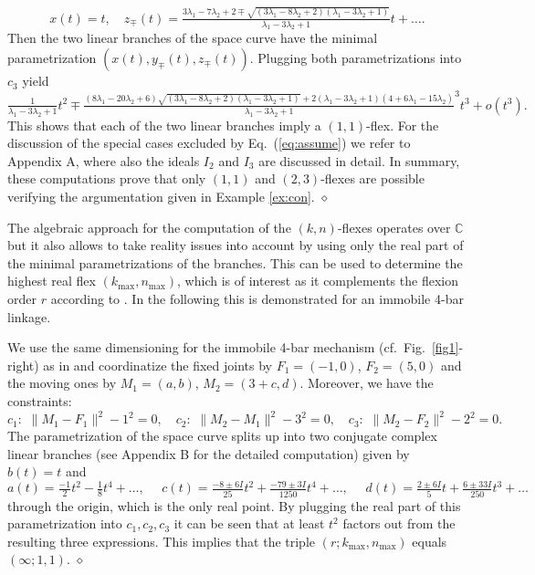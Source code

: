 \documentclass{svproc}
\def\CC{{\mathbb C}}
\begin{document}
\begin{example}
\begin{equation}
x(t)=t, \quad z_{\mp}(t)= \tfrac{3\lambda_1 - 7\lambda_2 + 2 \mp \sqrt{(3\lambda_1 - 8\lambda_2 + 2)(\lambda_1 - 3\lambda_2 + 1)} }{\lambda_1 - 3\lambda_2 + 1}t
+\ldots .
\end{equation} 
Then the two linear branches of the space curve have the minimal parametrization $(x(t),y_\mp(t),z_\mp(t))$. Plugging both  parametrizations into $c_3$ yield
\begin{equation*}
 \tfrac{1}{\lambda_1 - 3\lambda_2 + 1}t^2 \mp 
\tfrac{(8\lambda_1 - 20\lambda_2 + 6)\sqrt{(3\lambda_1 - 8\lambda_2 + 2)(\lambda_1 - 3\lambda_2 + 1)} + 2(\lambda_1 - 3\lambda_2 + 1)(4 + 6\lambda_1 - 15\lambda_2)}{\lambda_1 - 3\lambda_2 + 1}^3 t^3 +o(t^3).
\end{equation*}
This shows that each of the two linear branches imply a $(1,1)$-flex. 
For the discussion of the special cases excluded by  Eq.\ (\ref{eq:assume}) we refer to Appendix A, where also the ideals $I_2$ and $I_3$ are discussed in detail. In summary, these computations prove that only $(1,1)$ and $(2,3)$-flexes are possible verifying the argumentation given in Example \ref{ex:con}.
\hfill $\diamond$
\end{example}


The algebraic approach for the computation of the $(k,n)$-flexes  operates over $\CC$ but it also allows to take reality issues into account by using only the real part of the minimal parametrizations of the branches. This can be used to determine the highest real flex $(k_{\max},n_{\max})$, which is of interest as it  complements the flexion order $r$ according to  \cite[item 3 of Sec.\ 5]{MMT}. In the following this is demonstrated for an immobile 4-bar linkage.


\begin{example}\label{ex4}
We use the same dimensioning for the immobile 4-bar mechanism (cf.\ Fig.\ \ref{fig1}-right) as in \cite[Sec.\ 3.2]{nayak} and coordinatize the fixed joints by $F_1=(-1,0)$, $F_2=(5,0)$ and the moving ones by $M_1=(a,b)$, $M_2=(3+c,d)$. 
Moreover, we have the constraints:
\begin{equation*}
c_1:\,\,\|M_1-F_1\|^2-1^2=0,\quad
c_2:\,\,\|M_2-M_1\|^2-3^2=0,\quad
c_3:\,\,\|M_2-F_2\|^2-2^2=0.
\end{equation*}
The parametrization of the space curve splits up into two conjugate complex linear branches (see Appendix B for the detailed computation) given by $b(t)=t$ and
\begin{equation*}
a(t)=\tfrac{-1}{2}t^2  -\tfrac{1}{8}t^4  + \ldots, \,\,\,\,\,\,\,\,
c(t)=\tfrac{-8 \pm 6I}{25}t^2  + \tfrac{-79 \pm 3I}{1250}t^4 + \ldots,  \,\,\,\,\,\,\,\,
d(t)=\tfrac{2\pm 6I}{5}t +  \tfrac{6\pm 33I}{250}t^3 +\ldots
\end{equation*}
through the origin, which is the only real point. 
By plugging the real part of this parametrization %
into $c_1,c_2,c_3$ it can be seen that  at least $t^2$ factors out from the resulting three expressions. This implies that the triple $(r;k_{\max},n_{\max})$ equals $(\infty;1,1)$. \hfill $\diamond$ 
\end{example}
\end{document}

